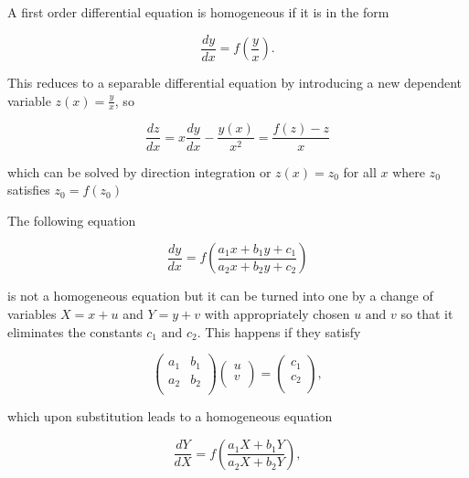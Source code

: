 \documentclass[english,a4paper,12pt]{report}
\begin{document}
A first order differential equation is homogeneous if it is in the form

\begin{equation}
    \frac{dy}{dx} = f\left(\frac{y}{x} \right).
\end{equation}

This reduces to a separable differential equation by introducing a new dependent variable \(z(x) = \frac{y}{x} \), so

\begin{equation}
    \frac{dz}{dx} = x\frac{dy}{dx} - \frac{y(x)}{x^2} = \frac{f(z)-z}{x}  
\end{equation}

which can be solved by direction integration or \(z(x) = z_0 \) for all \(x\) where \(z_0 \) satisfies \(z_0 = f(z_0 )\) 

The following equation

\begin{equation}
    \frac{dy}{dx} = f\left(\frac{a_1 x+b_1 y+c_1 }{a_2 x+b_2 y+c_2 } \right)
\end{equation}

is not a homogeneous equation but it can be turned into one by a change of variables \(X = x+u\) and \(Y = y+v\) with appropriately chosen \(u\text { and } v\) so that it eliminates the constants \(c_1 \text { and } c_2 \). This happens if they satisfy 

\begin{equation} \label{X=x+u} 
    \begin{pmatrix}
        a_1  &  b_1  \\
        a_2  &  b_2  \\
    \end{pmatrix} \begin{pmatrix}
         u \\
         v \\
    \end{pmatrix} = \begin{pmatrix}
         c_1  \\
        c_2   \\
    \end{pmatrix} ,
\end{equation}

which upon substitution leads to a homogeneous equation

\begin{equation}
    \frac{dY}{dX} = f\left( \frac{a_1 X+b_1 Y}{a_2 X+b_2 Y}  \right),
\end{equation}
\end{document}
